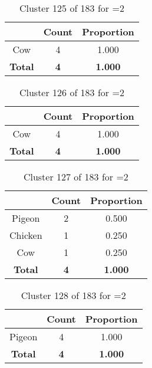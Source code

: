 \begin{table}[ht!]
\centering
\begin{tabular}{|c|c|c|}
\hline
\bf \Spec{} &\bf Count &\bf Proportion\\ \hline \hline
Cow & 4 & 1.000\\ \hline
\hline
\bf Total & \bf 4 & \bf 1.000\\ \hline
\end{tabular}
\label{tab:cluster:125:2}
\caption{Cluster 125 of 183 for \minneigh{}=2}
\end{table}

\begin{table}[ht!]
\centering
\begin{tabular}{|c|c|c|}
\hline
\bf \Spec{} &\bf Count &\bf Proportion\\ \hline \hline
Cow & 4 & 1.000\\ \hline
\hline
\bf Total & \bf 4 & \bf 1.000\\ \hline
\end{tabular}
\label{tab:cluster:126:2}
\caption{Cluster 126 of 183 for \minneigh{}=2}
\end{table}

\begin{table}[ht!]
\centering
\begin{tabular}{|c|c|c|}
\hline
\bf \Spec{} &\bf Count &\bf Proportion\\ \hline \hline
Pigeon & 2 & 0.500\\ \hline
Chicken & 1 & 0.250\\ \hline
Cow & 1 & 0.250\\ \hline
\hline
\bf Total & \bf 4 & \bf 1.000\\ \hline
\end{tabular}
\label{tab:cluster:127:2}
\caption{Cluster 127 of 183 for \minneigh{}=2}
\end{table}

\begin{table}[ht!]
\centering
\begin{tabular}{|c|c|c|}
\hline
\bf \Spec{} &\bf Count &\bf Proportion\\ \hline \hline
Pigeon & 4 & 1.000\\ \hline
\hline
\bf Total & \bf 4 & \bf 1.000\\ \hline
\end{tabular}
\label{tab:cluster:128:2}
\caption{Cluster 128 of 183 for \minneigh{}=2}
\end{table}

